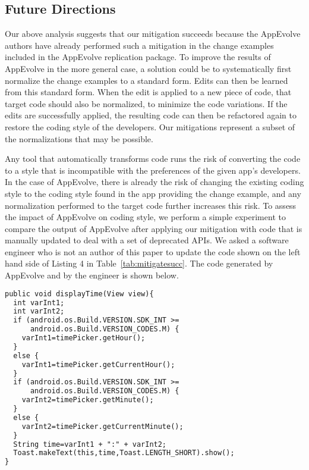 \subsection{Future Directions}

Our above analysis suggests that our mitigation succeeds because the
AppEvolve authors have already performed such a mitigation in the change
examples included in the AppEvolve replication package.  To improve the
results of AppEvolve in the more general case, a solution could be to
systematically first normalize the change examples to a standard form.
Edits can then be learned from this standard form. When the edit is applied
to a new piece of code, that target code should also be normalized, to
minimize the code variations. If the edits are successfully applied, the
resulting code can then be refactored again to restore the coding style of
the developers.  Our mitigations represent a subset of the normalizations
that may be possible.

Any tool that automatically transforms code runs the risk of converting the
code to a style that is incompatible with the preferences of the given
app's developers.  In the case of AppEvolve, there is already the risk of
changing the existing coding style to the coding style found in the app
providing the change example, and any normalization performed to the target
code further increases this risk.  To assess the impact of AppEvolve on
coding style, we perform a simple experiment to compare the output of
AppEvolve after applying our mitigation with code that is manually updated
to deal with a set of deprecated APIs.  We asked a software engineer who is
not an author of this paper to update the code shown on the left hand side
of Listing 4 in Table~\ref{tab:mitigatesucc}. The code generated by
AppEvolve and by the engineer is shown below.


\vspace{0.2cm}
\vspace{0.5cm}\begin{lstlisting}[language=diff,numbers=none]
public void displayTime(View view){
  int varInt1;
  int varInt2;
  if (android.os.Build.VERSION.SDK_INT >=
      android.os.Build.VERSION_CODES.M) {
    varInt1=timePicker.getHour();
  }
  else {
    varInt1=timePicker.getCurrentHour();
  }
  if (android.os.Build.VERSION.SDK_INT >=
      android.os.Build.VERSION_CODES.M) {
    varInt2=timePicker.getMinute();
  }
  else {
    varInt2=timePicker.getCurrentMinute();
  }
  String time=varInt1 + ":" + varInt2;
  Toast.makeText(this,time,Toast.LENGTH_SHORT).show();
}
\end{lstlisting}


